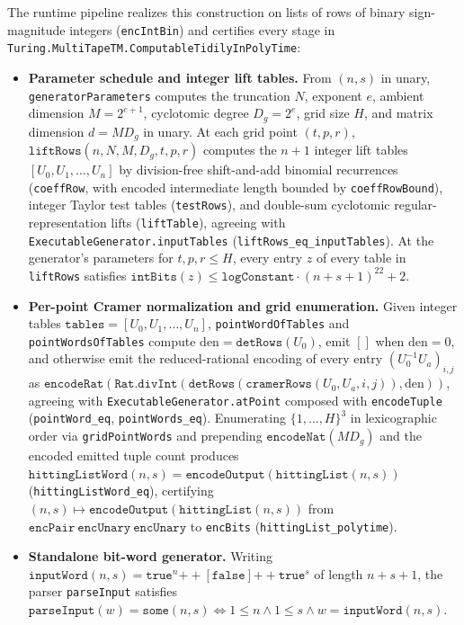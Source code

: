 \begin{longresult}
The runtime pipeline realizes this construction on lists of rows of binary sign-magnitude integers
(\texttt{encIntBin}) and certifies every stage in
\texttt{Turing.MultiTapeTM.ComputableTidilyInPolyTime}:
\begin{itemize}
\item \textbf{Parameter schedule and integer lift tables.} From $(n,s)$ in unary,
\texttt{generatorParameters} computes the truncation $N$, exponent $e$, ambient dimension $M=2^{e+1}$,
cyclotomic degree $D_g=2^e$, grid size $H$, and matrix dimension $d=MD_g$ in unary. At each grid
point $(t,p,r)$, $\texttt{liftRows}(n,N,M,D_g,t,p,r)$ computes the $n+1$ integer lift tables
$[U_0,U_1,\dots,U_n]$ by division-free shift-and-add binomial recurrences (\texttt{coeffRow}, with
encoded intermediate length bounded by \texttt{coeffRowBound}), integer Taylor test tables
(\texttt{testRows}), and double-sum cyclotomic regular-representation lifts (\texttt{liftTable}),
agreeing with \texttt{ExecutableGenerator.inputTables} (\texttt{liftRows\_eq\_inputTables}). At the
generator's parameters for $t,p,r\le H$, every entry $z$ of every table in \texttt{liftRows}
satisfies $\texttt{intBits}(z)\le\texttt{logConstant}\cdot(n+s+1)^{22}+2$.
\item \textbf{Per-point Cramer normalization and grid enumeration.} Given integer tables
$\texttt{tables}=[U_0,U_1,\dots,U_n]$, \texttt{pointWordOfTables} and \texttt{pointWordsOfTables}
compute $\mathrm{den}=\texttt{detRows}(U_0)$, emit $[]$ when $\mathrm{den}=0$, and otherwise emit
the reduced-rational encoding of every entry $(U_0^{-1}U_a)_{i,j}$ as
$\texttt{encodeRat}(\texttt{Rat.divInt}(\texttt{detRows}(\texttt{cramerRows}(U_0,U_a,i,j)),\mathrm{den}))$,
agreeing with \texttt{ExecutableGenerator.atPoint} composed with \texttt{encodeTuple}
(\texttt{pointWord\_eq}, \texttt{pointWords\_eq}). Enumerating $\{1,\dots,H\}^3$ in lexicographic
order via \texttt{gridPointWords} and prepending $\texttt{encodeNat}(MD_g)$ and the encoded emitted
tuple count produces $\texttt{hittingListWord}(n,s)=\texttt{encodeOutput}(\texttt{hittingList}(n,s))$
(\texttt{hittingListWord\_eq}), certifying $(n,s)\mapsto\texttt{encodeOutput}(\texttt{hittingList}(n,s))$
from $\texttt{encPair}\ \texttt{encUnary}\ \texttt{encUnary}$ to \texttt{encBits}
(\texttt{hittingList\_polytime}).
\item \textbf{Standalone bit-word generator.} Writing
$\texttt{inputWord}(n,s)=\texttt{true}^n\mathbin{+\!+}[\texttt{false}]\mathbin{+\!+}\texttt{true}^s$
of length $n+s+1$, the parser \texttt{parseInput} satisfies
$\texttt{parseInput}(w)=\texttt{some}(n,s)\iff 1\le n\wedge 1\le s\wedge w=\texttt{inputWord}(n,s)$.

\end{itemize}
\end{longresult}
